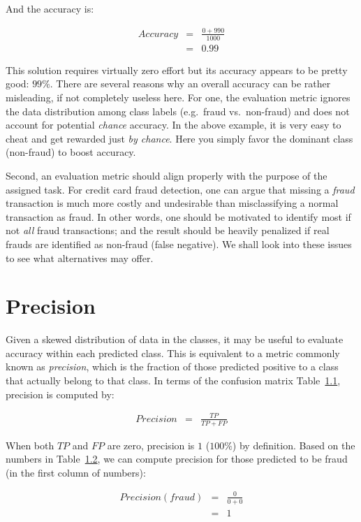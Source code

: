 \documentclass[
  letterpaper,
]{scrbook}
\begin{document}
And the accuracy is:

\[\begin{aligned}
  Accuracy
  & = & \frac{0 + 990}{1000} \\
  & = & 0.99
\end{aligned}\]

This solution requires virtually zero effort but its accuracy appears to
be pretty good: \(99\%\). There are several reasons why an overall
accuracy can be rather misleading, if not completely useless here. For
one, the evaluation metric ignores the data distribution among class
labels (e.g.~fraud vs.~non-fraud) and does not account for potential
\emph{chance} accuracy. In the above example, it is very easy to cheat
and get rewarded just \emph{by chance}. Here you simply favor the
dominant class (non-fraud) to boost accuracy.

Second, an evaluation metric should align properly with the purpose of
the assigned task. For credit card fraud detection, one can argue that
missing a \emph{fraud} transaction is much more costly and undesirable
than misclassifying a normal transaction as fraud. In other words, one
should be motivated to identify most if not \emph{all} fraud
transactions; and the result should be heavily penalized if real frauds
are identified as non-fraud (false negative). We shall look into these
issues to see what alternatives may offer.

\section{Precision}\label{precision}

Given a skewed distribution of data in the classes, it may be useful to
evaluate accuracy within each predicted class. This is equivalent to a
metric commonly known as \emph{precision}, which is the fraction of
those predicted positive to a class that actually belong to that class.
In terms of the confusion matrix Table~\hyperref[tab-eval-cmatrix]{1.1},
precision is computed by:

\[\begin{aligned}
  Precision
  & = & \frac{TP}{TP + FP}
\end{aligned}\]

When both \(TP\) and \(FP\) are zero, precision is \(1\) (\(100\%\)) by
definition. Based on the numbers in
Table~\hyperref[tab-eval-cmatrix0]{1.2}, we can compute precision for
those predicted to be fraud (in the first column of numbers):

\[\begin{aligned}
  Precision(fraud)
  & = & \frac{0}{0 + 0} \\
  & = & 1
\end{aligned}\]
\end{document}
